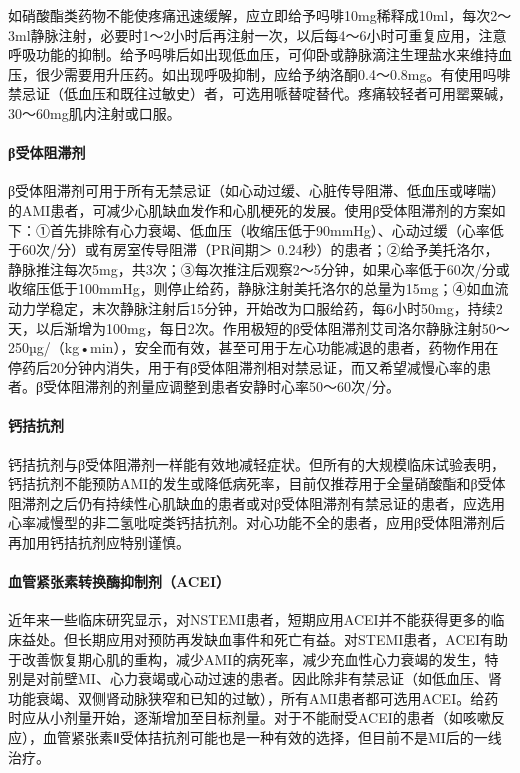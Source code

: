 如硝酸酯类药物不能使疼痛迅速缓解，应立即给予吗啡10mg稀释成10ml，每次2～3ml静脉注射，必要时1～2小时后再注射一次，以后每4～6小时可重复应用，注意呼吸功能的抑制。给予吗啡后如出现低血压，可仰卧或静脉滴注生理盐水来维持血压，很少需要用升压药。如出现呼吸抑制，应给予纳洛酮0.4～0.8mg。有使用吗啡禁忌证（低血压和既往过敏史）者，可选用哌替啶替代。疼痛较轻者可用罂粟碱，30～60mg肌内注射或口服。

\paragraph{β受体阻滞剂}

β受体阻滞剂可用于所有无禁忌证（如心动过缓、心脏传导阻滞、低血压或哮喘）的AMI患者，可减少心肌缺血发作和心肌梗死的发展。使用β受体阻滞剂的方案如下：①首先排除有心力衰竭、低血压（收缩压低于90mmHg）、心动过缓（心率低于60次/分）或有房室传导阻滞（PR间期＞
0.24秒）的患者；②给予美托洛尔，静脉推注每次5mg，共3次；③每次推注后观察2～5分钟，如果心率低于60次/分或收缩压低于100mmHg，则停止给药，静脉注射美托洛尔的总量为15mg；④如血流动力学稳定，末次静脉注射后15分钟，开始改为口服给药，每6小时50mg，持续2天，以后渐增为100mg，每日2次。作用极短的β受体阻滞剂艾司洛尔静脉注射50～250µg/（kg•min），安全而有效，甚至可用于左心功能减退的患者，药物作用在停药后20分钟内消失，用于有β受体阻滞剂相对禁忌证，而又希望减慢心率的患者。β受体阻滞剂的剂量应调整到患者安静时心率50～60次/分。

\paragraph{钙拮抗剂}

钙拮抗剂与β受体阻滞剂一样能有效地减轻症状。但所有的大规模临床试验表明，钙拮抗剂不能预防AMI的发生或降低病死率，目前仅推荐用于全量硝酸酯和β受体阻滞剂之后仍有持续性心肌缺血的患者或对β受体阻滞剂有禁忌证的患者，应选用心率减慢型的非二氢吡啶类钙拮抗剂。对心功能不全的患者，应用β受体阻滞剂后再加用钙拮抗剂应特别谨慎。

\paragraph{血管紧张素转换酶抑制剂（ACEI）}

近年来一些临床研究显示，对NSTEMI患者，短期应用ACEI并不能获得更多的临床益处。但长期应用对预防再发缺血事件和死亡有益。对STEMI患者，ACEI有助于改善恢复期心肌的重构，减少AMI的病死率，减少充血性心力衰竭的发生，特别是对前壁MI、心力衰竭或心动过速的患者。因此除非有禁忌证（如低血压、肾功能衰竭、双侧肾动脉狭窄和已知的过敏），所有AMI患者都可选用ACEI。给药时应从小剂量开始，逐渐增加至目标剂量。对于不能耐受ACEI的患者（如咳嗽反应），血管紧张素Ⅱ受体拮抗剂可能也是一种有效的选择，但目前不是MI后的一线治疗。

